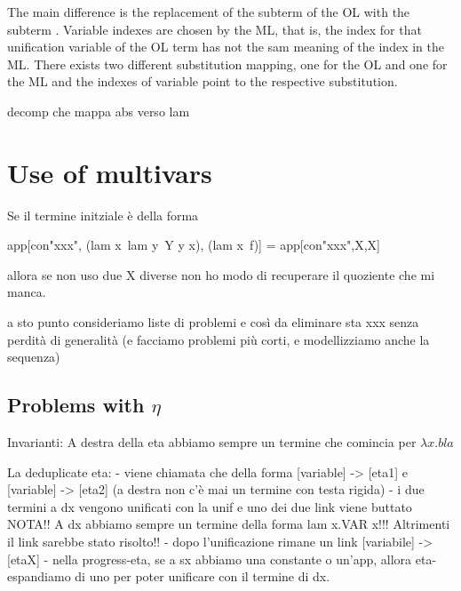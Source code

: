 \documentclass[sigconf,natbib=false,review]{acmart}
\begin{document}
\noindent
The main difference is the replacement of the subterm  of
the OL with the subterm . Variable indexes are chosen by the
ML, that is, the index  for that unification variable of the OL term
has not the sam meaning of the index  in the ML. There exists two
different substitution mapping, one for the OL and one for the ML and the indexes
of variable point to the respective substitution.

decomp che mappa abs verso lam
\noindent
{}

\section{Use of multivars}

Se il termine initziale è della forma

\begin{elpicode}
  app[con"xxx", (lam x\ lam y\ Y y x), (lam x\ f)]
  =
  app[con"xxx",X,X]
\end{elpicode}

allora se non uso due X diverse non ho modo di recuperare il quoziente che mi manca.

a sto punto consideriamo liste di problemi e così da eliminare sta xxx senza
perdità di generalità (e facciamo problemi più corti, e modellizziamo anche la
sequenza)

\subsection{Problems with $\eta$}

Invarianti:
A destra della eta abbiamo sempre un termine che comincia per $\lambda x. bla$

\begin{textcode}
  La deduplicate eta:
  - viene chiamata che della forma [variable] -> [eta1] e [variable] -> [eta2] 
    (a destra non c'è mai un termine con testa rigida)
  - i due termini a dx vengono unificati con la unif e uno dei due link viene buttato
    NOTA!! A dx abbiamo sempre un termine della forma lam x.VAR x!!!
    Altrimenti il link sarebbe stato risolto!!
  - dopo l'unificazione rimane un link [variabile] -> [etaX] 
  - nella progress-eta, se a sx abbiamo una constante o un'app, allora eta-espandiamo
    di uno per poter unificare con il termine di dx.
\end{textcode}
  
\end{document}
